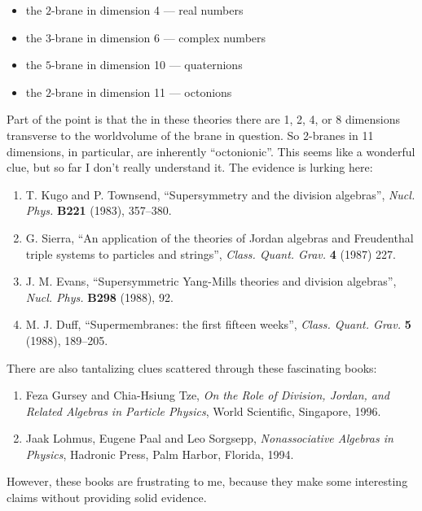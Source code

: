 \documentclass{article}
\def\tightlist{}
\begin{document}
\begin{itemize}
\tightlist
\item
  the \(2\)-brane in dimension 4 --- real numbers
\item
  the \(3\)-brane in dimension 6 --- complex numbers
\item
  the \(5\)-brane in dimension 10 --- quaternions
\item
  the \(2\)-brane in dimension 11 --- octonions
\end{itemize}

Part of the point is that the in these theories there are 1, 2, 4, or 8
dimensions transverse to the worldvolume of the brane in question. So
2-branes in 11 dimensions, in particular, are inherently ``octonionic''.
This seems like a wonderful clue, but so far I don't really understand
it. The evidence is lurking here:

\begin{enumerate}
\def\labelenumi{\arabic{enumi})}
\setcounter{enumi}{4}
\item
  T. Kugo and P. Townsend, ``Supersymmetry and the division algebras'',
  \emph{Nucl. Phys.} \textbf{B221} (1983), 357--380.
\item
  G. Sierra, ``An application of the theories of Jordan algebras and
  Freudenthal triple systems to particles and strings'', \emph{Class.
  Quant. Grav.} \textbf{4} (1987) 227.
\item
  J. M. Evans, ``Supersymmetric Yang-Mills theories and division
  algebras'', \emph{Nucl. Phys.} \textbf{B298} (1988), 92.
\item
  M. J. Duff, ``Supermembranes: the first fifteen weeks'', \emph{Class.
  Quant. Grav.} \textbf{5} (1988), 189--205.
\end{enumerate}

There are also tantalizing clues scattered through these fascinating
books:

\begin{enumerate}
\def\labelenumi{\arabic{enumi})}
\setcounter{enumi}{8}
\item
  Feza Gursey and Chia-Hsiung Tze, \emph{On the Role of Division,
  Jordan, and Related Algebras in Particle Physics}, World Scientific,
  Singapore, 1996.
\item
  Jaak Lohmus, Eugene Paal and Leo Sorgsepp, \emph{Nonassociative
  Algebras in Physics}, Hadronic Press, Palm Harbor, Florida, 1994.
\end{enumerate}

However, these books are frustrating to me, because they make some
interesting claims without providing solid evidence.
\end{document}
